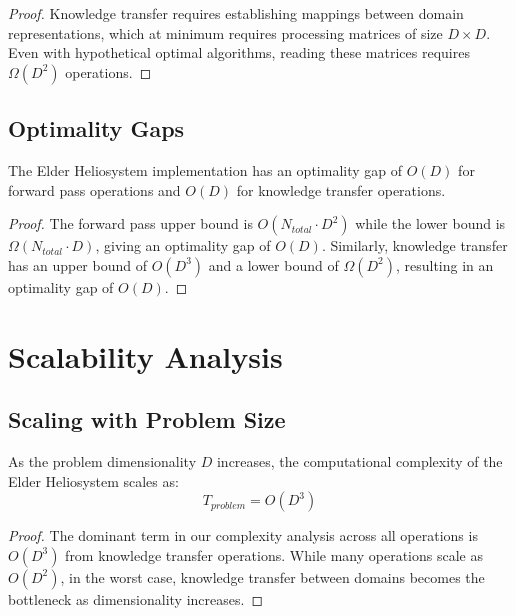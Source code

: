 \begin{proof}
Knowledge transfer requires establishing mappings between domain representations, which at minimum requires processing matrices of size $D \times D$. Even with hypothetical optimal algorithms, reading these matrices requires $\Omega(D^2)$ operations.
\end{proof}

\subsection{Optimality Gaps}

\begin{theorem}
The Elder Heliosystem implementation has an optimality gap of $O(D)$ for forward pass operations and $O(D)$ for knowledge transfer operations.
\end{theorem}

\begin{proof}
The forward pass upper bound is $O(N_{total} \cdot D^2)$ while the lower bound is $\Omega(N_{total} \cdot D)$, giving an optimality gap of $O(D)$. Similarly, knowledge transfer has an upper bound of $O(D^3)$ and a lower bound of $\Omega(D^2)$, resulting in an optimality gap of $O(D)$.
\end{proof}

\section{Scalability Analysis}



\subsection{Scaling with Problem Size}

\begin{theorem}
As the problem dimensionality $D$ increases, the computational complexity of the Elder Heliosystem scales as:
\begin{equation}
T_{problem} = O(D^3)
\end{equation}
\end{theorem}

\begin{proof}
The dominant term in our complexity analysis across all operations is $O(D^3)$ from knowledge transfer operations. While many operations scale as $O(D^2)$, in the worst case, knowledge transfer between domains becomes the bottleneck as dimensionality increases.
\end{proof}

